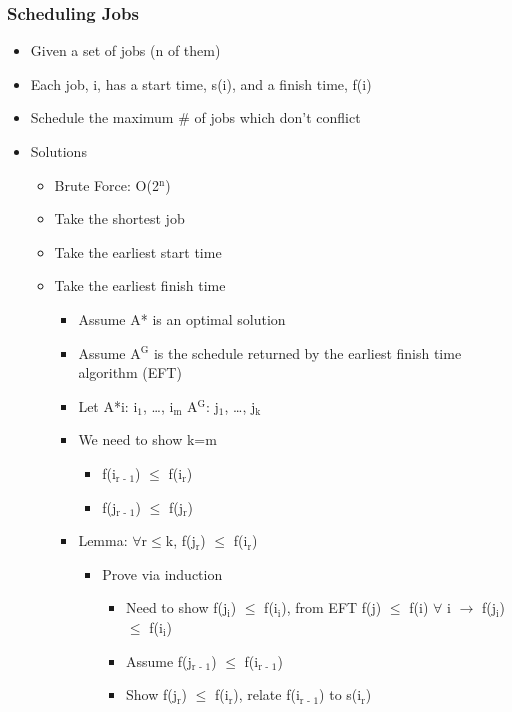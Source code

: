 \documentclass[11pt]{article}
\begin{document}
\subsubsection*{Scheduling Jobs}
\label{sec:org484e496}
\begin{itemize}
\item Given a set of jobs (n of them)
\item Each job, i, has a start time, s(i), and a finish time, f(i)
\item Schedule the maximum \# of jobs which don't conflict
\end{itemize}
\begin{itemize}
\item Solutions
\label{sec:org62de941}
\begin{itemize}
\item Brute Force: O(2\(^{\text{n}}\))
\item Take the shortest job
\item Take the earliest start time
\item Take the earliest finish time
\begin{itemize}
\item Assume A* is an optimal solution
\item Assume A\(^{\text{G}}\) is the schedule returned by the earliest finish time algorithm (EFT)
\item Let A*i: i\(_{\text{1}}\), \ldots{}, i\(_{\text{m}}\) A\(^{\text{G}}\): j\(_{\text{1}}\), \ldots{}, j\(_{\text{k}}\)
\item We need to show k=m 
\begin{itemize}
\item f(i\(_{\text{r - 1}}\)) \(\le\) f(i\(_{\text{r}}\))
\item f(j\(_{\text{r - 1}}\)) \(\le\) f(j\(_{\text{r}}\))
\end{itemize}
\item Lemma: \(\forall\)r\(\le\)k, f(j\(_{\text{r}}\)) \(\le\) f(i\(_{\text{r}}\))
\begin{itemize}
\item Prove via induction
\begin{itemize}
\item Need to show f(j\(_{\text{i}}\)) \(\le\) f(i\(_{\text{i}}\)), from EFT f(j) \(\le\) f(i) \(\forall\) i \(\rightarrow\) f(j\(_{\text{i}}\)) \(\le\) f(i\(_{\text{i}}\))
\item Assume f(j\(_{\text{r - 1}}\)) \(\le\) f(i\(_{\text{r - 1}}\))
\item Show f(j\(_{\text{r}}\)) \(\le\) f(i\(_{\text{r}}\)), relate f(i\(_{\text{r - 1}}\)) to s(i\(_{\text{r}}\))

\end{itemize}
\end{itemize}
\end{itemize}
\end{itemize}
\end{itemize}
\end{document}
